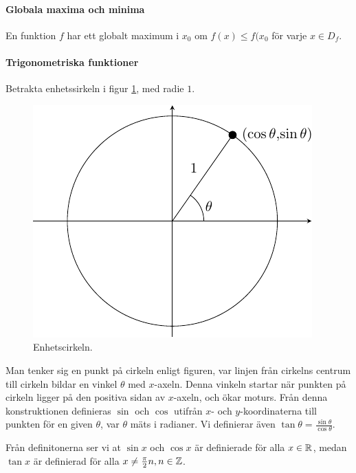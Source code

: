 \paragraph{Globala maxima och minima}
En funktion $f$ har ett globalt maximum i $x_0$ om $f(x)\leq f(x_0$ för varje $x\in D_f$.

\paragraph{Trigonometriska funktioner}

Betrakta enhetssirkeln i figur \ref{fig:unit_circle}, med radie $1$.

\begin{figure}[!ht]
	\includegraphics[width=\linewidth]{./Images/unit_circle/unit_circle.pdf}
	\caption{Enhetscirkeln.}
	\label{fig:unit_circle}
\end{figure}

Man tenker sig en punkt på cirkeln enligt figuren, var linjen från cirkelns centrum till cirkeln bildar en vinkel $\theta$ med $x$-axeln. Denna vinkeln startar när punkten på cirkeln ligger på den positiva sidan av $x$-axeln, och ökar moturs. Från denna konstruktionen definieras $\sin$ och $\cos$ utifrån $x$- och $y$-koordinaterna till punkten för en given $\theta$, var $\theta$ mäts i radianer. Vi definierar även $\tan\theta=\frac{\sin\theta}{\cos\theta}$.

Från definitonerna ser vi at $\sin x$ och $\cos x$ är definierade för alla $x\in\mathbb{R}$, medan $\tan x$ är definierad för alla $x\neq \frac{\pi}{2}n, n\in\mathbb{Z}$.

